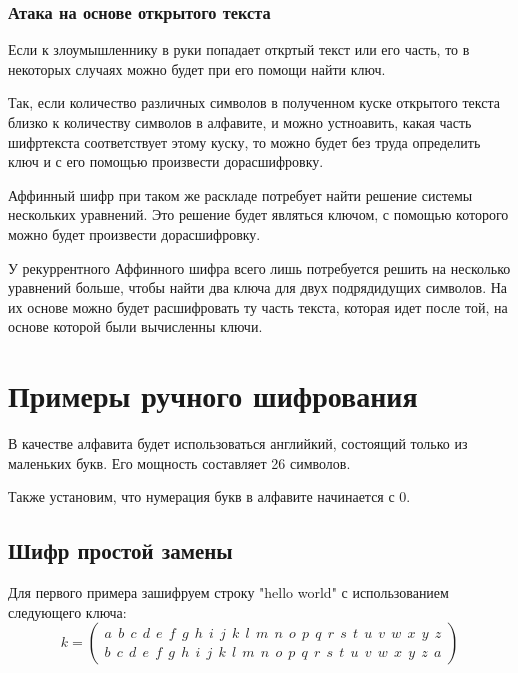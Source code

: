 \documentclass[a4paper]{article}
\begin{document}
  \subsubsection{Атака на основе открытого текста}

  Если к злоумышленнику в руки попадает откртый текст или его часть, то в некоторых случаях
  можно будет при его помощи найти ключ.

  Так, если количество различных символов в полученном куске открытого текста близко к количеству
  символов в алфавите, и можно устноавить, какая часть шифртекста соответствует этому куску, то 
  можно будет без труда определить ключ и с его помощью произвести дорасшифровку.

  Аффинный шифр при таком же раскладе потребует найти решение системы нескольких уравнений.
  Это решение будет являться ключом, с помощью которого можно будет произвести дорасшифровку.

  У рекуррентного Аффинного шифра всего лишь потребуется решить на несколько уравнений больше, чтобы
  найти два ключа для двух подрядидущих символов. На их основе можно будет расшифровать ту 
  часть текста, которая идет после той, на основе которой были вычисленны ключи.

  \newpage

  \section{Примеры ручного шифрования}

  В качестве алфавита будет использоваться английкий, состоящий только из маленьких букв.
  Его мощность составляет 26 символов.

  Также установим, что нумерация букв в алфавите начинается с 0.

  \subsection{Шифр простой замены}

  Для первого примера зашифруем строку "hello world" с использованием следующего ключа:
  \begin{equation}
    k = \begin{pmatrix}
        a \:\: b \:\: c \:\: d \:\: e \:\: f \:\: g \:\: h \:\: i \:\: j \:\: k \:\: l \:\: m \:\: n \:\: o \:\: p \:\: q \:\: r \:\: s \:\: t \:\: u \:\: v \:\: w \:\: x \:\: y \:\: z \\
        b \:\: c \:\: d \:\: e \:\: f \:\: g \:\: h \:\: i \:\: j \:\: k \:\: l \:\: m \:\: n \:\: o \:\: p \:\: q \:\: r \:\: s \:\: t \:\: u \:\: v \:\: w \:\: x \:\: y \:\: z \:\: a
    \end{pmatrix}
    \label{eq:sp_k1}
  \end{equation}
\end{document}
